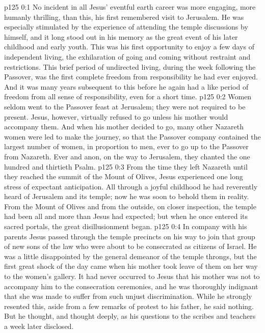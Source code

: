 \author{Midwayer Commission}
\vs p125 0:1 No incident in all Jesus’ eventful earth career was more engaging, more humanly thrilling, than this, his first remembered visit to Jerusalem. He was especially stimulated by the experience of attending the temple discussions by himself, and it long stood out in his memory as the great event of his later childhood and early youth. This was his first opportunity to enjoy a few days of independent living, the exhilaration of going and coming without restraint and restrictions. This brief period of undirected living, during the week following the Passover, was the first complete freedom from responsibility he had ever enjoyed. And it was many years subsequent to this before he again had a like period of freedom from all sense of responsibility, even for a short time.
\pc \vs p125 0:2 Women seldom went to the Passover feast at Jerusalem; they were not required to be present. Jesus, however, virtually refused to go unless his mother would accompany them. And when his mother decided to go, many other Nazareth women were led to make the journey, so that the Passover company contained the largest number of women, in proportion to men, ever to go up to the Passover from Nazareth. Ever and anon, on the way to Jerusalem, they chanted the one hundred and thirtieth Psalm.
\vs p125 0:3 From the time they left Nazareth until they reached the summit of the Mount of Olives, Jesus experienced one long stress of expectant anticipation. All through a joyful childhood he had reverently heard of Jerusalem and its temple; now he was soon to behold them in reality. From the Mount of Olives and from the outside, on closer inspection, the temple had been all and more than Jesus had expected; but when he once entered its sacred portals, the great disillusionment began.
\vs p125 0:4 In company with his parents Jesus passed through the temple precincts on his way to join that group of new sons of the law who were about to be consecrated as citizens of Israel. He was a little disappointed by the general demeanor of the temple throngs, but the first great shock of the day came when his mother took leave of them on her way to the women’s gallery. It had never occurred to Jesus that his mother was not to accompany him to the consecration ceremonies, and he was thoroughly indignant that she was made to suffer from such unjust discrimination. While he strongly resented this, aside from a few remarks of protest to his father, he said nothing. But he thought, and thought deeply, as his questions to the scribes and teachers a week later disclosed.
